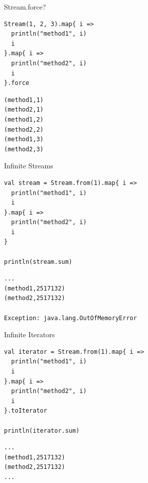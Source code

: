 \documentclass[xcolor=svgnames]{beamer}
\begin{document}
    \begin{frame}[fragile] %
    {Stream.force?}
        \begin{Verbatim}[formatcom=\sffamily]
Stream(1, 2, 3).map{ i =>
  println("method1", i)
  i
}.map{ i =>
  println("method2", i)
  i
}.force
        \end{Verbatim}

        \noindent\makebox[\linewidth]{\rule{\paperwidth}{0.4pt}}

        \pause

        \begin{Verbatim}[formatcom=\sffamily]
(method1,1)
(method2,1)
(method1,2)
(method2,2)
(method1,3)
(method2,3)
        \end{Verbatim}
    \end{frame}

    \begin{frame}[fragile] %
    {Infinite Streams}
        \begin{Verbatim}[formatcom=\sffamily]
val stream = Stream.from(1).map{ i =>
  println("method1", i)
  i
}.map{ i =>
  println("method2", i)
  i
}

println(stream.sum)
        \end{Verbatim}

        \noindent\makebox[\linewidth]{\rule{\paperwidth}{0.4pt}}

        \pause

        \begin{Verbatim}[formatcom=\sffamily]
...
(method1,2517132)
(method2,2517132)

Exception: java.lang.OutOfMemoryError
        \end{Verbatim}
    \end{frame}

    \begin{frame}[fragile] %
    {Infinite Iterators}
        \begin{Verbatim}[formatcom=\sffamily]
val iterator = Stream.from(1).map{ i =>
  println("method1", i)
  i
}.map{ i =>
  println("method2", i)
  i
}.toIterator

println(iterator.sum)
        \end{Verbatim}

        \noindent\makebox[\linewidth]{\rule{\paperwidth}{0.4pt}}

        \pause

        \begin{Verbatim}[formatcom=\sffamily]
...
(method1,2517132)
(method2,2517132)
...
        \end{Verbatim}
    \end{frame}
\end{document}
